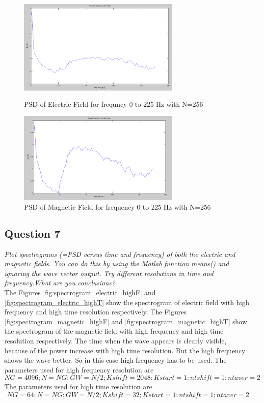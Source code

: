 \documentclass{article}
\begin{document}
\begin{figure}[htb!]
\begin{minipage}[c]{0.5\linewidth}
\centering
\includegraphics[width=8cm]{Figures/PSD_electric_N_256.png}
\caption{PSD of Electric Field for frequncy 0 to 225 Hz with N=256}
\label{fig:PSD_electric_N_256}
\end{minipage}
\hspace{0.1cm}
\begin{minipage}[c]{0.5\linewidth}
\centering
\includegraphics[width=8cm]{Figures/PSD_magnetic_N_256.png}
\caption{PSD of Magnetic Field for frequency 0 to 225 Hz with N=256}
\label{fig:PSD_magnetic_N_256}
\end{minipage}
\end{figure}


\subsection{Question 7}
\textit{Plot spectrograms (=PSD versus time and frequency) of both the electric and magnetic fields. You can do this by using the Matlab function means() and ignoring the wave vector output. Try different resolutions in time and frequency.What are you conclusions?}\\

The Figures \ref{fig:spectrogram_electric_highF} and \ref{fig:spectrogram_electric_highT} show the spectrogram of electric field with high frequency and high time resolution respectively. The Figures \ref{fig:spectrogram_magnetic_highF} and \ref{fig:spectrogram_magnetic_highT} show the spectrogram of the magnetic field with high frequency and high time resolution respectively. The time when the wave appears is clearly visible, because of the power increase with high time resolution. But the high frequency shows the wave better. So in this case high frequency has to be used. The parameters used for high frequency resolution are $$NG = 4096;N = NG;GW = N/2;Kshift = 2048;Kstart = 1;ntshift=1;ntaver=2$$The parameters used for high time resolution are $$NG = 64;N = NG;GW = N/2;Kshift = 32;Kstart = 1;ntshift=1;ntaver=2$$
\end{document}
